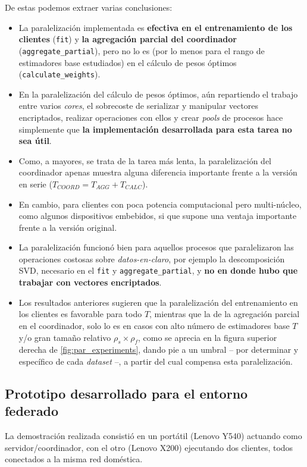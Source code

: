 \documentclass[00-Trabajo_Final.tex]{subfiles}
\begin{document}
 De estas podemos extraer varias conclusiones:
\begin{itemize}[noitemsep, topsep=2pt]
    \item La paralelización implementada es \textbf{efectiva en el entrenamiento de los clientes} (\texttt{fit}) y \textbf{la agregación parcial del coordinador} (\texttt{aggregate\_partial}), pero no lo es (por lo menos para el rango de estimadores base estudiados) en el cálculo de pesos óptimos (\texttt{calculate\_weights}).
    \item En la paralelización del cálculo de pesos óptimos, aún repartiendo el trabajo entre varios \textit{cores}, el sobrecoste de serializar y manipular vectores encriptados, realizar operaciones con ellos y crear \textit{pools} de procesos hace simplemente que \textbf{la implementación desarrollada para esta tarea no sea útil}.
    \item Como, a mayores, se trata de la tarea más lenta, la paralelización del coordinador apenas muestra alguna diferencia importante frente a la versión en serie ($T_{COORD} = T_{AGG} + T_{CALC}$).
    \item En cambio, para clientes con poca potencia computacional pero multi-núcleo, como algunos dispositivos embebidos, si que supone una ventaja importante frente a la versión original.
    \item La paralelización funcionó bien para aquellos procesos que paralelizaron las operaciones costosas sobre \textit{datos-en-claro}, por ejemplo la descomposición SVD, necesario en el \texttt{fit} y \texttt{aggregate\_partial}, y \textbf{no en donde hubo que trabajar con vectores encriptados}.
    \item Los resultados anteriores sugieren que la paralelización del entrenamiento en los clientes es favorable para todo $T$, mientras que la de la agregación parcial en el coordinador, solo lo es en casos con alto número de estimadores base $T$ y/o gran tamaño relativo $\rho_s\times\rho_f$, como se aprecia en la figura superior derecha de \ref{fig:par_experiments}, dando pie a un umbral{ }--{ }por determinar y específico de cada \textit{dataset}{ }--{}, a partir del cual compensa esta paralelización.
\end{itemize}



\subsection{Prototipo desarrollado para el entorno federado}
La demostración realizada consistió en un portátil (Lenovo Y540) actuando como servidor/coordinador, con el otro (Lenovo X200) ejecutando dos clientes, todos conectados a la misma red doméstica.
\end{document}
